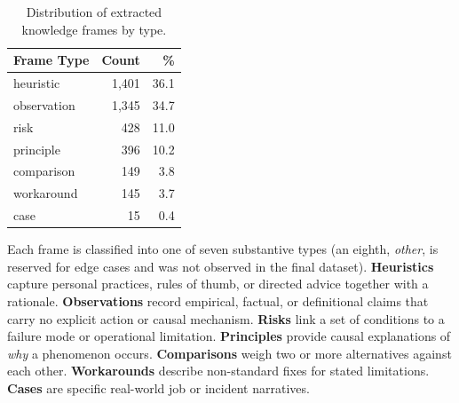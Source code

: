 
\begin{table}[t]
\caption{Distribution of extracted knowledge frames by type.}
\label{tab:frame-types}
\centering
\begin{tabular}{lrr}
\toprule
Frame Type & Count & \% \\
\midrule
heuristic   & 1{,}401 & 36.1 \\
observation & 1{,}345 & 34.7 \\
risk        & 428     & 11.0 \\
principle   & 396     & 10.2 \\
comparison  & 149     &  3.8 \\
workaround  & 145     &  3.7 \\
case        &  15     &  0.4 \\
\bottomrule
\end{tabular}
\end{table}

Each frame is classified into one of seven substantive types (an
eighth, \emph{other}, is reserved for edge cases and was not observed
in the final dataset).  \textbf{Heuristics} capture personal
practices, rules of thumb, or directed advice together with a
rationale.  \textbf{Observations} record empirical, factual, or
definitional claims that carry no explicit action or causal mechanism.
\textbf{Risks} link a set of conditions to a failure mode or
operational limitation.  \textbf{Principles} provide causal
explanations of \emph{why} a phenomenon occurs.
\textbf{Comparisons} weigh two or more alternatives against each
other.  \textbf{Workarounds} describe non-standard fixes for stated
limitations.  \textbf{Cases} are specific real-world job or incident
narratives.


